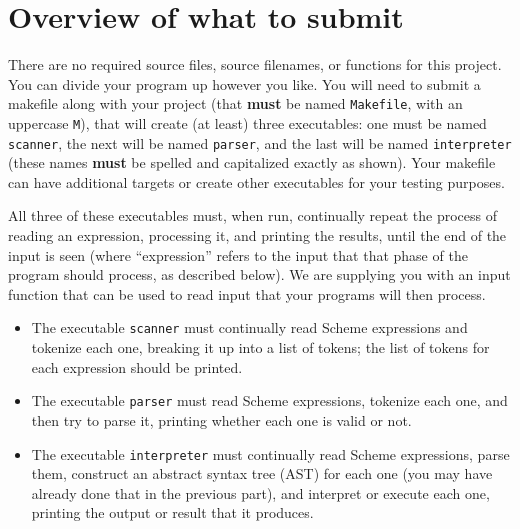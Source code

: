 \documentclass[11pt]{article}
\begin{document}
  \section{Overview of what to submit}

    There are no required source files, source filenames, or functions for
  this project.  You can divide your program up however you like.  You will
  need to submit a makefile along with your project (that \textbf{must} be
  named \texttt{Makefile}, with an uppercase \texttt{M}), that will create
  (at least) three executables: one must be named \texttt{scanner}, the next
  will be named \texttt{parser}, and the last will be named
  \texttt{interpreter} (these names \textbf{must} be spelled and capitalized
  exactly as shown).  Your makefile can have additional targets or create
  other executables for your testing purposes.

    All three of these executables must, when run, continually repeat the
  process of reading an expression, processing it, and printing the results,
  until the end of the input is seen (where ``expression'' refers to the
  input that that phase of the program should process, as described below).
  We are supplying you with an input function that can be used to read
  input that your programs will then process.

    \vspace{-2.5mm}

    \begin{itemize}

      \addtolength{\itemsep}{-1mm}

      \item The executable \texttt{scanner} must continually read Scheme
            expressions and tokenize each one, breaking it up into a list of
            tokens; the list of tokens for each expression should be
            printed.

      \item The executable \texttt{parser} must read Scheme expressions,
            tokenize each one, and then try to parse it, printing whether
            each one is valid or not.

      \item The executable \texttt{interpreter} must continually read Scheme
            expressions, parse them, construct an abstract syntax tree (AST)
            for each one (you may have already done that in the previous
            part), and interpret or execute each one, printing the output or
            result that it produces.

    \end{itemize}
\end{document}
